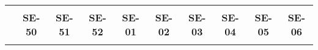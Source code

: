 \begin{tabular}{lccccccccc}
	\textbf{}              & \multicolumn{1}{l}{}                        & \multicolumn{1}{l}{}      & \multicolumn{1}{l}{}                         & \multicolumn{1}{l}{}                         & \multicolumn{1}{l}{}                         & \multicolumn{1}{l}{}                        & \multicolumn{1}{l}{}                         & \multicolumn{1}{l}{}                         & \multicolumn{1}{l}{}     \\
	\textbf{}                                                                               
	
	&\textbf{SE-50}								&\textbf{SE-51}					  &\textbf{SE-52}
	&\textbf{SE-01}								&\textbf{SE-02}					 &\textbf{SE-03}
	&\textbf{SE-04}								&\textbf{SE-05}	&\textbf{SE-06}\\
		\textbf{}              
	  	

\end{tabular}
